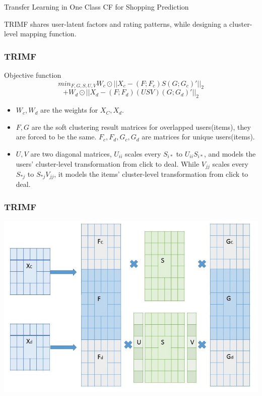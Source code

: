 \documentclass[xetex,mathserif,serif]{beamer}
\begin{document}
\begin{section}{Transfer Learning in One Class CF for Shopping Prediction}
\begin{frame}
    TRIMF shares user-latent factors and rating patterns, while designing a cluster-level mapping function.
  \end{frame}
  \begin{frame}
    \frametitle{TRIMF}
    \begin{block}
      {Objective function}
      {$$min_{F,G,S,U,V} W_c\odot ||X_c - (F;F_c)S(G;G_c)'||_2$$ $$+ W_d\odot ||X_d - (F;F_d)(USV)(G;G_d)'||_2 $$}
    \end{block}
    \begin{itemize}
    \item $W_c,W_d$ are the weights for $X_C, X_d$.
    \item $F, G$ are the soft clustering result matrices for overlapped users(items), they are forced to be the same. $F_c,F_d,G_c,G_d$ are matrices for unique users(items).
    \item $U,V$ are two diagonal matrices, $U_{ii}$ scales every $S_{i*}$ to $U_{ii}S_{i*}$, and models the users' cluster-level transformation from click to deal. While $V_{jj}$ scales every $S_{*j}$ to $S_{*j}V_{jj}$, it models the items' cluster-level transformation from click to deal.
    \end{itemize}
  \end{frame}
  \begin{frame}
    \frametitle{TRIMF}
    \includegraphics[width=\textwidth]{fig/trimf.jpg}  
  \end{frame}

\end{section}
\end{document}
